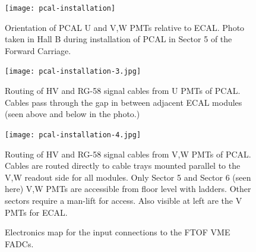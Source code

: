 \documentclass[letterpaper,10pt]{article}
\begin{document}
\begin{figure}[htbp]
  \centering
  \texttt{[image: pcal-installation]}
  \vspace{2mm}
  \caption{Orientation of PCAL U and V,W PMTs relative to ECAL.  Photo taken in Hall B during installation
  of PCAL in Sector 5 of the Forward Carriage.}
\label{pcal-pmts-2}
\end{figure}

\begin{figure}[htbp]
  \centering
  \texttt{[image: pcal-installation-3.jpg]}
  \vspace{2mm}
  \caption{Routing of HV and RG-58 signal cables from U PMTs of PCAL.  Cables pass through the
  gap in between adjacent ECAL modules (seen above and below in the photo.)}
\label{pcal-pmts-3}
\end{figure}

\begin{figure}[htbp]
  \centering
  \texttt{[image: pcal-installation-4.jpg]}
  \vspace{2mm}
  \caption{Routing of HV and RG-58 signal cables from V,W PMTs of PCAL.  Cables are routed directly to
    cable trays mounted parallel to the V,W readout side for all modules. Only Sector 5 and Sector 6
    (seen here) V,W PMTs are accessible from floor level with ladders.  Other sectors require a man-lift for access.
     Also visible at left are the V PMTs for ECAL.}
\label{pcal-pmts-4}
\end{figure}


\begin{figure}[htbp]
\vspace{20.0cm}

\caption{Electronics map for the input connections to the FTOF VME FADCs.}
\label{ftof-fadc-map}
\end{figure}
\end{document}
